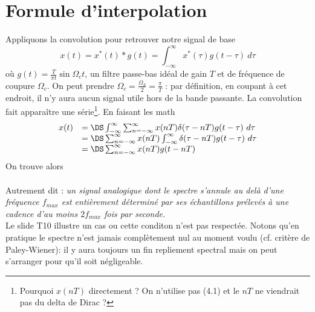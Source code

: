 	\section{Formule d'interpolation}
	Appliquons la convolution  pour retrouver notre signal de base
	\begin{equation}
	x(t) = x^*(t)*g(t) = \int_{-\infty}^\infty x^*(\tau)g(t-\tau)\ d\tau
	\end{equation}
	où $g(t) = \frac{T}{\pi t}\sin\Omega_ct$, un filtre passe-bas idéal de gain $T$ et de fréquence 
	de coupure $\Omega_c$. On peut prendre $\Omega_c = \frac{\Omega_S}{2}=\frac{\pi}{T}$ : par définition, 
	en coupant à cet endroit, il n'y aura aucun signal utile hors de la bande passante. La convolution 
	fait apparaître une série\footnote{Pourquoi $x(nT)$ directement ? On n'utilise pas (4.1) et le $nT$ 
	ne viendrait pas du delta de Dirac ?}. En faisant les math
	\begin{equation}
	\begin{array}{ll}
	x(t) &= \DS \int_{-\infty}^\infty\sum_{n=-\infty}^\infty x(nT)\delta(\tau-nT)g(t-\tau)\ d\tau\\
	&= \DS \sum_{n=-\infty}^\infty x(nT)\int_{-\infty}^\infty \delta(\tau-nT)g(t-\tau)\ d\tau\\
	&=\DS \sum_{n=-\infty}^\infty x(nT)g(t-nT)
	\end{array}
	\end{equation}
	On trouve alors \\
	
	\ \\
	 
	Autrement dit : \textit{un signal analogique dont le spectre s'annule au delà d'une fréquence 
	$f_{max}$ est entièrement déterminé par ses échantillons prélevés à une cadence d'au moins 
	$2f_{max}$ fois par seconde.}\ \\
	
	Le slide T10 illustre un cas ou cette conditon n'est pas respectée.  Notons qu'en pratique le 
	spectre n'est jamais complètement nul au moment voulu (cf. critère de Paley-Wiener): il y aura 
	toujours un fin repliement 	spectral mais on peut s'arranger pour qu'il soit négligeable.
	
